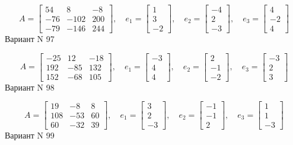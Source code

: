 \documentclass[11pt]{report}
\begin{document}
$$A = \left[\begin{matrix}54 & 8 & -8\\-76 & -102 & 200\\-79 & -146 & 244\end{matrix}\right],\quad e_1 = \left[\begin{matrix}1\\3\\-2\end{matrix}\right],\quad e_2 = \left[\begin{matrix}-4\\2\\-3\end{matrix}\right],\quad e_3 = \left[\begin{matrix}4\\-2\\4\end{matrix}\right]$$Вариант N 97

$$A = \left[\begin{matrix}-25 & 12 & -18\\192 & -85 & 132\\152 & -68 & 105\end{matrix}\right],\quad e_1 = \left[\begin{matrix}-3\\4\\4\end{matrix}\right],\quad e_2 = \left[\begin{matrix}2\\-1\\-2\end{matrix}\right],\quad e_3 = \left[\begin{matrix}-3\\2\\3\end{matrix}\right]$$Вариант N 98

$$A = \left[\begin{matrix}19 & -8 & 8\\108 & -53 & 60\\60 & -32 & 39\end{matrix}\right],\quad e_1 = \left[\begin{matrix}3\\2\\-3\end{matrix}\right],\quad e_2 = \left[\begin{matrix}-1\\-1\\2\end{matrix}\right],\quad e_3 = \left[\begin{matrix}1\\1\\-3\end{matrix}\right]$$Вариант N 99
\end{document}
